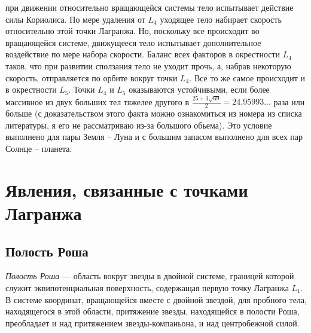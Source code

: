 \documentclass[a4paper,12pt]{article}
\begin{document}
при движении относительно вращающейся системы тело испытывает действие силы Кориолиса.
По мере удаления от $L_4$ уходящее тело набирает скорость относительно этой точки Лагранжа.
Но, поскольку все происходит во вращающейся системе, движущееся
тело испытывает дополнительное воздействие по мере набора скорости.
Баланс всех факторов в окрестности $L_4$ таков, что при развитии сползания тело не уходит прочь,
а, набрав некоторую скорость, отправляется по орбите вокруг точки $L_4$.
Все то же самое происходит и в окрестности $L_5$. Точки $L_4$ и $L_5$ оказываются устойчивыми, если
более массивное из двух больших тел тяжелее другого в $\frac{25 + 3 \sqrt{69}}{2} = 24.95993...$ раза или больше
(с доказательством этого факта можно ознакомиться из \cite{Neil} номера из списка литературы, я его не рассматриваю из-за большого обьема).
Это условие выполнено для пары Земля – Луна и с большим запасом выполнено для всех пар Солнце – планета.

\section{Явления, связанные с точками Лагранжа}

\subsection{Полость Роша}

\textit{Полость Роша} — область вокруг звезды в двойной системе, границей которой служит эквипотенциальная поверхность, содержащая первую точку Лагранжа $L_1.$
В системе координат, вращающейся вместе с двойной звездой, для пробного тела, находящегося в этой области,
притяжение звезды, находящейся в полости Роша, преобладает и над притяжением звезды-компаньона, и над центробежной силой.
\end{document}
